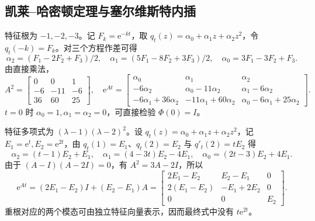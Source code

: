 \subsection{凯莱--哈密顿定理与塞尔维斯特内插}



\sol 特征根为 $-1,-2,-3$。记 $F_k=\mathrm e^{-kt}$，取 $q_t(z)=\alpha_0+\alpha_1z+\alpha_2z^2$，令 $q_t(-k)=F_k$。对三个方程作差可得
\[
\alpha_2=(F_1-2F_2+F_3)/2,\quad
\alpha_1=(5F_1-8F_2+3F_3)/2,\quad
\alpha_0=3F_1-3F_2+F_3 .
\]
由直接乘法，
\[
A^2=\begin{bmatrix}0&0&1\\-6&-11&-6\\36&60&25\end{bmatrix},\quad
\mathrm e^{At}=
\begin{bmatrix}
\alpha_0&\alpha_1&\alpha_2\\
-6\alpha_2&\alpha_0-11\alpha_2&\alpha_1-6\alpha_2\\
-6\alpha_1+36\alpha_2&-11\alpha_1+60\alpha_2&\alpha_0-6\alpha_1+25\alpha_2
\end{bmatrix}.
\]
$t=0$ 时 $\alpha_0=1,\alpha_1=\alpha_2=0$，可直接检验 $\Phi(0)=I$。



\sol 特征多项式为 $(\lambda-1)(\lambda-2)^2$。设 $q_t(z)=\alpha_0+\alpha_1z+\alpha_2z^2$，记 $E_1=\mathrm e^t,E_2=\mathrm e^{2t}$，由 $q_t(1)=E_1$、$q_t(2)=E_2$ 与 $q'_t(2)=tE_2$ 得
\[
\alpha_2=(t-1)E_2+E_1,\quad
\alpha_1=(4-3t)E_2-4E_1,\quad
\alpha_0=(2t-3)E_2+4E_1.
\]
由于 $(A-I)(A-2I)=0$，有 $A^2=3A-2I$，所以
\[
\mathrm e^{At}=(2E_1-E_2)I+(E_2-E_1)A
=\begin{bmatrix}
2E_1-E_2&E_2-E_1&0\\
2(E_1-E_2)&-E_1+2E_2&0\\
0&0&E_2
\end{bmatrix}.
\]
重根对应的两个模态可由独立特征向量表示，因而最终式中没有 $t\mathrm e^{2t}$。

